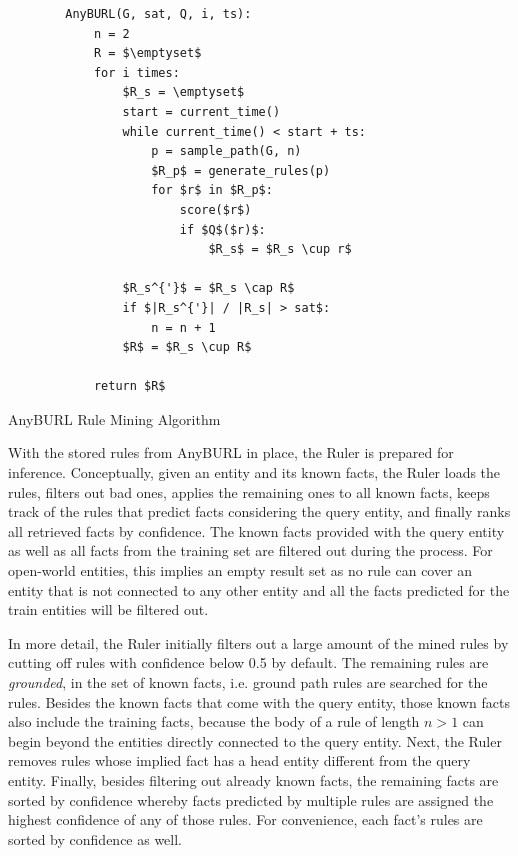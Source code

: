 \begin{listing}
    \begin{lstlisting}
        AnyBURL(G, sat, Q, i, ts):
            n = 2
            R = $\emptyset$
            for i times:
                $R_s = \emptyset$
                start = current_time()
                while current_time() < start + ts:
                    p = sample_path(G, n)
                    $R_p$ = generate_rules(p)
                    for $r$ in $R_p$:
                        score($r$)
                        if $Q$($r)$:
                            $R_s$ = $R_s \cup r$

                $R_s^{'}$ = $R_s \cap R$
                if $|R_s^{'}| / |R_s| > sat$:
                    n = n + 1
                $R$ = $R_s \cup R$

            return $R$
    \end{lstlisting}
    \caption{AnyBURL Rule Mining Algorithm}
    \label{code:anyburl}
\end{listing}

With the stored rules from AnyBURL in place, the Ruler is prepared for inference. Conceptually, given an entity and its known facts, the Ruler loads the rules, filters out bad ones, applies the remaining ones to all known facts, keeps track of the rules that predict facts considering the query entity, and finally ranks all retrieved facts by confidence. The known facts provided with the query entity as well as all facts from the training set are filtered out during the process. For open-world entities, this implies an empty result set as no rule can cover an entity that is not connected to any other entity and all the facts predicted for the train entities will be filtered out.

In more detail, the Ruler initially filters out a large amount of the mined rules by cutting off rules with confidence below 0.5 by default. The remaining rules are \emph{grounded}, in the set of known facts, i.e. ground path rules are searched for the rules. Besides the known facts that come with the query entity, those known facts also include the training facts, because the body of a rule of length $n > 1$ can begin beyond the entities directly connected to the query entity. Next, the Ruler removes rules whose implied fact has a head entity different from the query entity. Finally, besides filtering out already known facts, the remaining facts are sorted by confidence whereby facts predicted by multiple rules are assigned the highest confidence of any of those rules. For convenience, each fact's rules are sorted by confidence as well.
